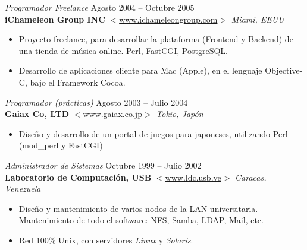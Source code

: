 \documentclass[line,margin]{res}
\begin{document}
\begin{resume}
                {\sl Programador Freelance} \hfill Agosto 2004 -- Octubre 
                2005 \\
                \textbf{iChameleon Group INC} 
                $<$\url{www.ichameleongroup.com}$>$ \hfill \textit{Miami, EEUU}
                \begin{itemize}  \itemsep 2pt %
                \item Proyecto freelance, para desarrollar la plataforma 
                (Frontend y Backend) de una tienda de m\'{u}sica online. Perl, 
                FastCGI, PostgreSQL.
                \item Desarrollo de aplicaciones cliente para Mac (Apple), en el 
                lenguaje Objective-C, bajo el Framework Cocoa.
                \\
                \end{itemize}

                {\sl Programador (pr\'{a}cticas)} \hfill Agosto 2003 -- Julio 
                2004 \\
                \textbf{Gaiax Co, LTD} 
                $<$\url{www.gaiax.co.jp}$>$ \hfill \textit{Tokio, 
                Jap\'{o}n}
                \begin{itemize}  \itemsep 2pt %
                \item Dise\~{n}o y desarrollo de un portal de juegos para 
                japoneses, utilizando Perl (mod\_perl y FastCGI)
                \\
                \end{itemize} 

                {\sl Administrador de Sistemas} \hfill Octubre 1999 -- Julio 
                2002 \\
                \textbf{Laboratorio de Computaci\'{o}n, USB} 
                $<$\url{www.ldc.usb.ve}$>$
                \hfill \textit{Caracas, Venezuela}
                \begin{itemize}  \itemsep 2pt %
                \item Dise\~{n}o y mantenimiento de varios nodos de la LAN 
                universitaria. Mantenimiento de todo el software: NFS, Samba, LDAP, Mail, etc.
                \item Red 100\% Unix, con servidores \textit{Linux} y \textit{Solaris}.
                \end{itemize}


\end{resume}
\end{document}
